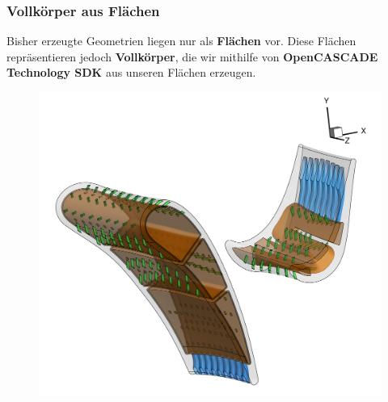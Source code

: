 \documentclass[8pt, aspectratio=169]{beamer}
\begin{document}
\begin{frame}
	\frametitle{Vollkörper aus Flächen}
	\vspace{-1.5cm}\hspace{-0.5cm}
	\begin{minipage}[t]{0.38\textwidth}
		\vspace{-2cm}
		Bisher erzeugte Geometrien liegen nur als \textbf{Flächen} vor. Diese Flächen repräsentieren jedoch \textbf{Vollkörper}, die wir mithilfe von \textbf{OpenCASCADE Technology SDK} aus unseren Flächen erzeugen.
	\end{minipage}
	\begin{minipage}{0.6\textwidth}
		\begin{figure}[H]
			\centering
			\includegraphics[width=\textwidth]{../../tec/complete/60.png}
		\end{figure}
	\end{minipage}
	\vfill
\end{frame}
\end{document}
